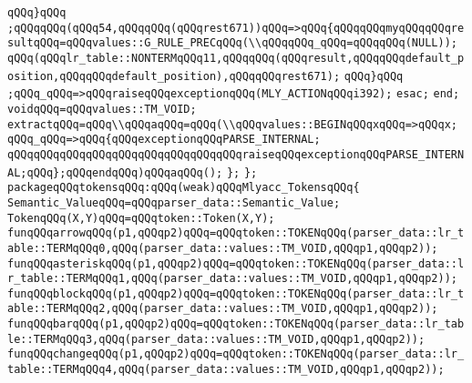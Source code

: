 \verb|qQQq}qQQq|\newline
\verb|;qQQqqQQq(qQQq54,qQQqqQQq(qQQqrest671))qQQq=>qQQq{qQQqqQQqmyqQQqqQQqresultqQQq=qQQqvalues::G_RULE_PRECqQQq(\\qQQqqQQq_qQQq=qQQqqQQq(NULL));|\newline
\verb|qQQq(qQQqlr_table::NONTERMqQQq11,qQQqqQQq(qQQqresult,qQQqqQQqdefault_position,qQQqqQQqdefault_position),qQQqqQQqrest671);|\newline
\verb|qQQq}qQQq|\newline
\verb|;qQQq_qQQq=>qQQqraiseqQQqexceptionqQQq(MLY_ACTIONqQQqi392);|\newline
\verb|esac;|\newline
\verb|end;|\newline
\verb|voidqQQq=qQQqvalues::TM_VOID;|\newline
\verb|extractqQQq=qQQq\\qQQqaqQQq=qQQq(\\qQQqvalues::BEGINqQQqxqQQq=>qQQqx;|\newline
\verb|qQQq_qQQq=>qQQq{qQQqexceptionqQQqPARSE_INTERNAL;|\newline
\verb|qQQqqQQqqQQqqQQqqQQqqQQqqQQqqQQqqQQqraiseqQQqexceptionqQQqPARSE_INTERNAL;qQQq};qQQqendqQQq)qQQqaqQQq();|\newline
\verb|};|\newline
\verb|};|\newline
\verb|packageqQQqtokensqQQq:qQQq(weak)qQQqMlyacc_TokensqQQq{|\newline
\verb|Semantic_ValueqQQq=qQQqparser_data::Semantic_Value;|\newline
\verb|TokenqQQq(X,Y)qQQq=qQQqtoken::Token(X,Y);|\newline
\verb|funqQQqarrowqQQq(p1,qQQqp2)qQQq=qQQqtoken::TOKENqQQq(parser_data::lr_table::TERMqQQq0,qQQq(parser_data::values::TM_VOID,qQQqp1,qQQqp2));|\newline
\verb|funqQQqasteriskqQQq(p1,qQQqp2)qQQq=qQQqtoken::TOKENqQQq(parser_data::lr_table::TERMqQQq1,qQQq(parser_data::values::TM_VOID,qQQqp1,qQQqp2));|\newline
\verb|funqQQqblockqQQq(p1,qQQqp2)qQQq=qQQqtoken::TOKENqQQq(parser_data::lr_table::TERMqQQq2,qQQq(parser_data::values::TM_VOID,qQQqp1,qQQqp2));|\newline
\verb|funqQQqbarqQQq(p1,qQQqp2)qQQq=qQQqtoken::TOKENqQQq(parser_data::lr_table::TERMqQQq3,qQQq(parser_data::values::TM_VOID,qQQqp1,qQQqp2));|\newline
\verb|funqQQqchangeqQQq(p1,qQQqp2)qQQq=qQQqtoken::TOKENqQQq(parser_data::lr_table::TERMqQQq4,qQQq(parser_data::values::TM_VOID,qQQqp1,qQQqp2));|\newline

